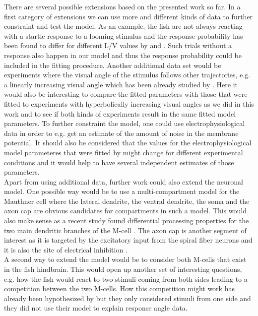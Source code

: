 \documentclass[a4paper,10pt,hidelinks]{scrreprt}
\begin{document}
    There are several possible extensions based on the presented work so far.
    In a first category of extensions we can use more and different kinds of data to further constraint and test the model.
    As an example, the fish are not always reacting with a startle response to a looming stimulus and the response probability has been found to differ for different L/V values by \cite{Bhattacharyya2017} and \cite{Temizer2015}.
    Such trials without a response also happen in our model and thus the response probability could be included in the fitting procedure.
    Another additional data set would be experiments where the visual angle of the stimulus follows other trajectories, e.g. a linearly increasing visual angle which has been already studied by \cite{Dunn2016}.
    Here it would also be interesting to compare the fitted parameters with those that were fitted to experiments with hyperbolically increasing visual angles as we did in this work and to see if both kinds of experiments result in the same fitted model parameters.
    To further constraint the model, one could use electrophysiological data in order to e.g. get an estimate of the amount of noise in the membrane potential.
    It should also be considered that the values for the electrophysiological model parameteres that were fitted by \cite{Koyama2016} might change for different experimental conditions and it would help to have several independent estimates of those parameters.\\
    Apart from using additional data, further work could also extend the neuronal model.
    One possible way would be to use a multi-compartment model for the Mauthner cell where the lateral dendrite, the ventral dendrite, the soma and the axon cap are obvious candidates for compartments in such a model.
    This would also make sense as a recent study found differential processing properties for the two main dendritic branches of the M-cell \citep{Medan2017}.
    The axon cap is another segment of interest as it is targeted by the excitatory input from the spiral fiber neurons \citep{Lacoste2015} and it is also the site of electrical inhibition \citep{Weiss2008}.\\
    A second way to extend the model would be to consider both M-cells that exist in the fish hindbrain.
    This would open up another set of interesting questions, e.g. how the fish would react to two stimuli coming from both sides leading to a competition between the two M-cells.
    How this competition might work has already been hypothesized by \cite{Koyama2016} but they only considered stimuli from one side and they did not use their model to explain response angle data.\\
\end{document}

